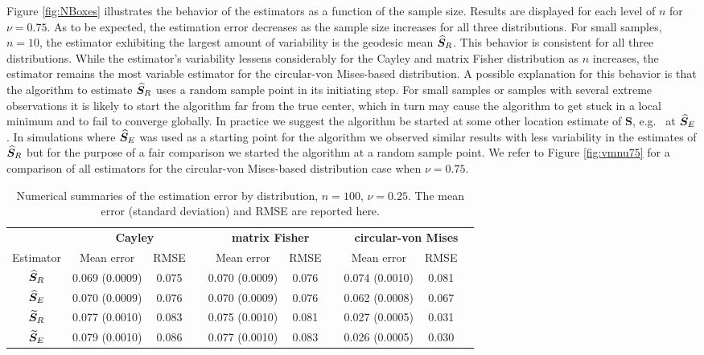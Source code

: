 Figure \ref{fig:NBoxes} illustrates the behavior of the estimators as a function of the sample size. Results are displayed for each level of $n$ for  $\nu=0.75$. As to be expected, the estimation error decreases as the sample size increases for all three distributions. For small samples, $n=10$, the estimator exhibiting the largest amount of variability is the geodesic mean ${\widehat{\bm S}_R}$. This behavior is consistent for all three distributions.  While the estimator's variability lessens considerably for the Cayley and matrix Fisher distribution as $n$ increases, the estimator remains the most variable estimator for the circular-von Mises-based distribution.  A possible explanation for this behavior is that the algorithm to estimate ${\widehat{\bm S}_R}$ uses a random sample point in its initiating step.  For small samples or samples with several extreme observations it is likely to start the algorithm far from the true center, which in turn may cause the algorithm to get stuck in a local minimum and to fail to converge globally.  In practice we suggest the algorithm be started at some other location estimate of $\bm S$, e.g.~ at ${\widehat{\bm S}_E}$. In simulations where ${\widehat{\bm S}_E}$ was used as a starting point for the algorithm we observed  similar results with less variability in the estimates of ${\widehat{\bm S}_R}$ but for the purpose of a fair comparison we started the algorithm at a random sample point.  We refer to Figure \ref{fig:vmnu75} for a comparison of all estimators for the circular-von Mises-based distribution case when $\nu=0.75$. 


\begin{center}
\begin{table}[h!]
\caption{Numerical summaries of the estimation error  by distribution, $n=100$,  $\nu=0.25$.  The mean error (standard deviation) and RMSE are reported here.  \label{tab:alldN100Nu25}}
\begin{tabular}{cccccccccc}
  \hline
		 &\multicolumn{3}{c}{\textbf{Cayley}} & \multicolumn{3}{c}{\textbf{matrix Fisher}}  & \multicolumn{3}{c}{\textbf{circular-von Mises}}\\ 
Estimator &   Mean error  & RMSE& &  Mean error & RMSE& &   Mean error& RMSE \\  \hline \hline %
 		  ${\widehat{\bm S}_R}$  &  0.069 (0.0009)& 0.075 & &  0.070 (0.0009)& 0.076&  & 0.074 (0.0010)& 0.081 \\ 
 		 ${\widehat{\bm S}_E}$ &   0.070 (0.0009)& 0.076 & &  0.070 (0.0009)& 0.076&  &  0.062 (0.0008)& 0.067\\ 
		 ${\widetilde{\bm S}_R}$   & 0.077 (0.0010)& 0.083 & &  0.075 (0.0010)& 0.081&  & 0.027 (0.0005)& 0.031\\ 
 		  ${\widetilde{\bm S}_E}$ & 0.079 (0.0010)& 0.086 & &  0.077 (0.0010)& 0.083 & & 0.026 (0.0005)& 0.030\\ \hline
\end{tabular}
\end{table}
\end{center}

